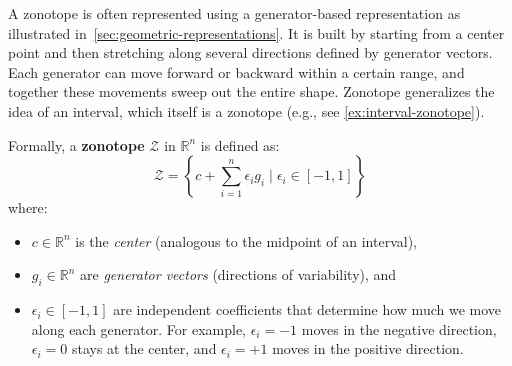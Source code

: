 \documentclass[oneside,11pt,dvipsnames]{book}
\numberwithin{equation}{section}
\theoremstyle{definition}
\theoremstyle{remark}
\begin{document}
A zonotope is often represented using a generator-based representation as illustrated in~\autoref{sec:geometric-representations}.
It is built by starting from a center point and then stretching along several directions defined by generator vectors.
Each generator can move forward or backward within a certain range, and together these movements sweep out the entire shape.
Zonotope generalizes the idea of an interval, which itself is a zonotope (e.g., see \autoref{ex:interval-zonotope}).

Formally, a \textbf{zonotope} \(\mathcal{Z}\) in \(\mathbb{R}^n\) is defined as:
\[
\mathcal{Z} = \left\{ c + \sum_{i=1}^{n} \epsilon_i g_i \mid \epsilon_i \in [-1, 1] \right\}
\]
where:
\begin{itemize}
\item \(c \in \mathbb{R}^n\) is the \textit{center} (analogous to the midpoint of an interval),
\item \(g_i \in \mathbb{R}^n\) are \textit{generator vectors} (directions of variability), and
\item \(\epsilon_i \in [-1,1]\) are independent coefficients that determine how much we move along each generator.
For example, \(\epsilon_i = -1\) moves in the negative direction, \(\epsilon_i = 0\) stays at the center, and \(\epsilon_i = +1\) moves in the positive direction.
\end{itemize}
\end{document}
